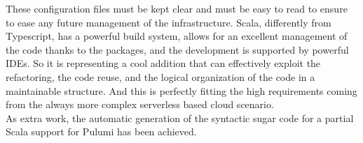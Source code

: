 These configuration files must be kept clear and must be easy to read to ensure to ease any future management of the infrastructure.
Scala, differently from Typescript, has a powerful build system, allows for an excellent management of the code thanks to the packages, and the development is supported by powerful IDEs.
So it is representing a cool addition that can effectively exploit the refactoring, the code reuse, and the logical organization of the code in a maintainable structure.
And this is perfectly fitting the high requirements coming from the always more complex serverless based cloud scenario.\\
As extra work, the automatic generation of the syntactic sugar code for a partial Scala support for Pulumi has been achieved.







